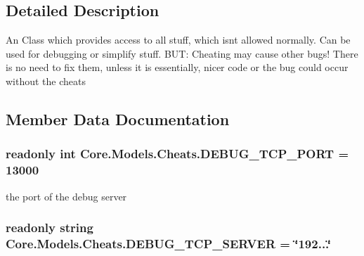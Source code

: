 \subsection{Detailed Description}
An Class which provides access to all stuff, which isn\textquotesingle{}t allowed normally. Can be used for debugging or simplify stuff. B\+U\+T\+: Cheating may cause other bugs! There is no need to fix them, unless it is essentially, nicer code or the bug could occur without the cheats 



\subsection{Member Data Documentation}
\hypertarget{classCore_1_1Models_1_1Cheats_a350ab15904dcc094785358b43aceff9c}{}
\subsubsection[{D\+E\+B\+U\+G\+\_\+\+T\+C\+P\+\_\+\+P\+O\+R\+T}]{\setlength{\rightskip}{0pt plus 5cm}readonly int Core.\+Models.\+Cheats.\+D\+E\+B\+U\+G\+\_\+\+T\+C\+P\+\_\+\+P\+O\+R\+T = 13000\hspace{0.3cm}{\ttfamily [static]}}\label{classCore_1_1Models_1_1Cheats_a350ab15904dcc094785358b43aceff9c}


the port of the debug server 

\hypertarget{classCore_1_1Models_1_1Cheats_ae8f7144fe92f2f033128c1285f45d052}{}
\subsubsection[{D\+E\+B\+U\+G\+\_\+\+T\+C\+P\+\_\+\+S\+E\+R\+V\+E\+R}]{\setlength{\rightskip}{0pt plus 5cm}readonly string Core.\+Models.\+Cheats.\+D\+E\+B\+U\+G\+\_\+\+T\+C\+P\+\_\+\+S\+E\+R\+V\+E\+R = \char`\"{}192...\char`\"{}\hspace{0.3cm}{\ttfamily [static]}}\label{classCore_1_1Models_1_1Cheats_ae8f7144fe92f2f033128c1285f45d052}


